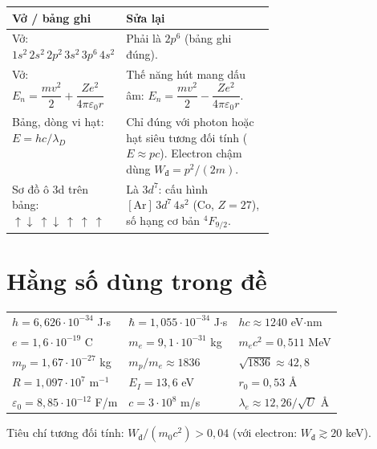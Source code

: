 \documentclass[11pt,a4paper]{article}
\newcommand{\Wd}{W_{\text{đ}}}
\begin{document}
\begin{center}
\renewcommand{\arraystretch}{1.3}
\begin{tabularx}{\linewidth}{@{}>{\raggedright\arraybackslash}p{0.38\linewidth}X@{}}
\toprule
Vở / bảng ghi & Sửa lại \\
\midrule
Vở: $1s^2\,2s^2\,2p^2\,3s^2\,3p^6\,4s^2$ & Phải là $2p^6$ (bảng ghi đúng). \\
Vở: $E_n=\dfrac{mv^2}{2}+\dfrac{Ze^2}{4\pi\varepsilon_0 r}$ & Thế năng hút mang dấu âm: $E_n=\dfrac{mv^2}{2}-\dfrac{Ze^2}{4\pi\varepsilon_0 r}$. \\
Bảng, dòng vi hạt: $E=hc/\lambda_D$ & Chỉ đúng với photon hoặc hạt siêu tương đối tính ($E\approx pc$). Electron chậm dùng $\Wd=p^2/(2m)$. \\
Sơ đồ ô 3d trên bảng: $\uparrow\downarrow\ \uparrow\downarrow\ \uparrow\ \uparrow\ \uparrow$ & Là $3d^7$: cấu hình $[\mathrm{Ar}]\,3d^7\,4s^2$ (Co, $Z=27$), số hạng cơ bản ${}^4F_{9/2}$. \\
\bottomrule
\end{tabularx}
\end{center}

\section*{Hằng số dùng trong đề}

\begin{center}
\renewcommand{\arraystretch}{1.3}
\begin{tabular}{@{}lll@{}}
\toprule
$h=6{,}626\cdot10^{-34}$ J$\cdot$s & $\hbar=1{,}055\cdot10^{-34}$ J$\cdot$s & $hc\approx1240$ eV$\cdot$nm \\
$e=1{,}6\cdot10^{-19}$ C & $m_e=9{,}1\cdot10^{-31}$ kg & $m_ec^2=0{,}511$ MeV \\
$m_p=1{,}67\cdot10^{-27}$ kg & $m_p/m_e\approx1836$ & $\sqrt{1836}\approx42{,}8$ \\
$R=1{,}097\cdot10^{7}$ m$^{-1}$ & $E_I=13{,}6$ eV & $r_0=0{,}53$ Å \\
$\varepsilon_0=8{,}85\cdot10^{-12}$ F/m & $c=3\cdot10^{8}$ m/s & $\lambda_e\approx12{,}26/\sqrt{U}$ Å \\
\bottomrule
\end{tabular}
\end{center}
Tiêu chí tương đối tính: $\Wd/(m_0c^2)>0{,}04$ (với electron: $\Wd\gtrsim20$ keV).

\end{document}
